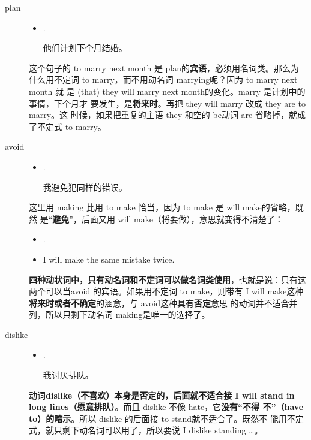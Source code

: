 \begin{description}

\item[plan]
  \begin{itemize}
  \item  {}  .

    他们计划下个月结婚。
  \end{itemize}

  这个句子的 to marry next month 是 plan的\textbf{宾语}，必须用名词类。那么为
  什么用不定词 to marry，而不用动名词 marrying呢？因为 to marry next month 就
  是 (that) they will marry next month的变化。marry 是计划中的事情，下个月才
  要发生，是\textbf{将来时}。再把 they will marry 改成 they are to marry。这
  时候，如果把重复的主语 they 和空的 be动词 are 省略掉，就成了不定式 to
  marry。

\item[avoid]

  \begin{itemize}
  \item  {}  .

    我避免犯同样的错误。
  \end{itemize}

  这里用 making 比用 to make 恰当，因为 to make 是 will make的省略，既然
  是“\textbf{避免}”，后面又用 will make（将要做），意思就变得不清楚了：

  \begin{itemize}
  \item {}  .
  \item  I will make the same mistake twice.
  \end{itemize}

  \textbf{四种动状词中，只有动名词和不定词可以做名词类使用}，也就是说：只有这
  两个可以当avoid 的宾语。如果用不定词 to make，则带有 I will
  make这种\textbf{将来时或者不确定}的涵意，与 avoid这种具有\textbf{否定}意思
  的动词并不适合并列，所以只剩下动名词 making是唯一的选择了。


\item[dislike]
  \begin{itemize}
  \item {}  .

    我讨厌排队。
  \end{itemize}

  动词\textbf{dislike（不喜欢）本身是否定的，后面就不适合接 I will stand in
    long lines（愿意排队）}。而且 dislike 不像 hate，它\textbf{没有“不得
    不”（have to）的暗示}。所以 dislike 的后面接 to stand就不适合了。既然不
  能用不定式，就只剩下动名词可以用了，所以要说 I dislike standing \ldots。
\end{description}

